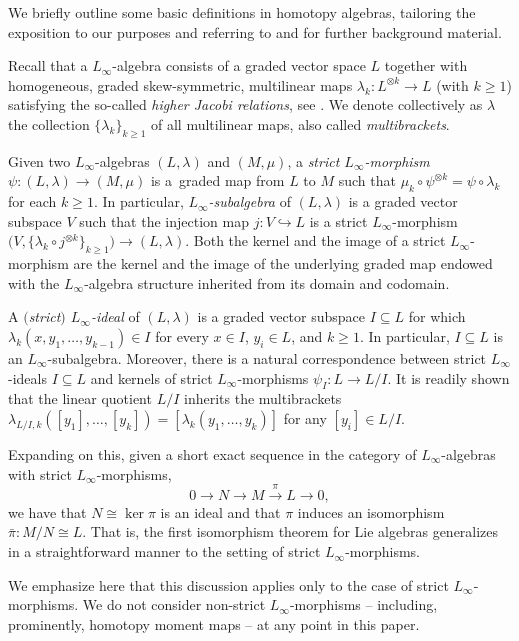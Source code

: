 \documentclass[pdftex]{sigma}
\numberwithin{equation}{section}
\renewcommand{\subset}{\subseteq}
\begin{document}
\begin{Remark}
We briefly outline some basic definitions in homotopy algebras, tailoring the exposition to our purposes and referring to \cite{LadaMarkl95} and \cite[Section~3]{Lazarev14} for further background material.

Recall that a $L_\infty$-algebra consists of a graded vector space $L$ together with homogeneous, graded skew-symmetric, multilinear maps $\lambda_k\colon L^{\otimes k} \to L$ (with $k\geq 1$) satisfying the so-called \emph{higher Jacobi relations}, see \cite[Definition~2.1]{LadaMarkl95}.
We denote collectively as $\lambda$ the collection $\{\lambda_k\}_{k\geq 1}$ of all multilinear maps, also called \emph{multibrackets}.

Given two $L_\infty$-algebras $(L,\lambda)$ and $(M,\mu)$, a \emph{strict $L_\infty$-morphism} $\psi\colon  (L,\lambda)\to(M,\mu)$ is a~graded map from $L$ to $M$ such that $\mu_k\circ \psi^{\otimes k} = \psi \circ \lambda_k$ for each $k\geq 1$. In particular, \emph{$L_\infty$-subalgebra} of $(L,\lambda)$ is a graded vector subspace $V$ such that the injection map $j\colon V\hookrightarrow L$ is a strict $L_\infty$-morphism $\bigl(V,\bigl\{\lambda_k\circ j^{\otimes k}\bigr\}_{k\geq 1}\bigr)\to (L,\lambda)$. Both the kernel and the image of a strict $L_\infty$-morphism are the kernel and the image of the underlying graded map endowed with the $L_\infty$-algebra structure inherited from its domain and codomain.

A \emph{$($strict$)$ $L_\infty$-ideal} of $(L,\lambda)$ is a graded vector subspace $I\subset L$ for which ${\lambda_k(x,y_1,\dots,y_{k{-}1})\! \in\! I}$ for every $x\in I$, $y_i \in L$, and $k\geq 1$. In particular, $I\subset L$ is an $L_\infty$-subalgebra. Moreover, there is a natural correspondence between strict $L_\infty$-ideals $I\subset L$ and kernels of strict $L_\infty$-morphisms $\psi_I\colon L\to L/I$. It is readily shown that the linear quotient $L/I$ inherits the multibrackets $\lambda_{L/I,k}([y_1],\dots,[y_k])=[\lambda_k(y_1,\dots, y_k)]$ for any $[y_i]\in L/I$.

Expanding on this, given a short exact sequence in the category of $L_\infty$-algebras with strict $L_\infty$-morphisms,
\[
	0\to N\to M \xrightarrow{\pi} L \to 0
	,
\]
we have that $N \cong \ker\pi$ is an ideal and that $\pi$ induces an isomorphism $\bar\pi\colon M/N \cong L$. That is, the first isomorphism theorem for Lie algebras generalizes in a straightforward manner to the setting of strict $L_\infty$-morphisms.

We emphasize here that this discussion applies only to the case of strict $L_\infty$-morphisms. We do not consider non-strict $L_\infty$-morphisms -- including, prominently, homotopy moment maps -- at any point in this paper.
\end{Remark}
\end{document}
